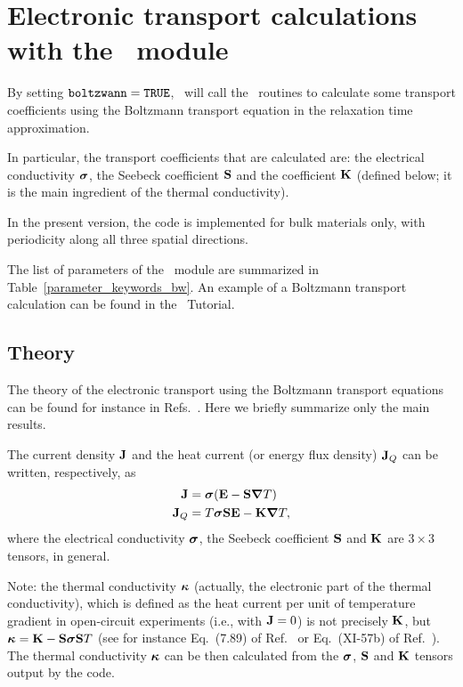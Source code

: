 \chapter{Electronic transport calculations with the \bw\ module}\label{ch:boltzwann}

By setting $\verb#boltzwann#=\verb#TRUE#$, \postw\ will call the \bw\ routines to calculate some transport coefficients using the Boltzmann transport equation in the relaxation time approximation.

In particular, the transport coefficients that are calculated are: the electrical conductivity $\bm{\mathrm{\sigma}}$, the Seebeck coefficient $\bm{\mathrm{S}}$ and the coefficient $\bm{\mathrm{K}}$ (defined below; it is the main ingredient of the thermal conductivity). 

In the present version, the code is implemented for bulk materials only, with periodicity along all three spatial directions.

The list of parameters of the \bw\ module are summarized in Table~\ref{parameter_keywords_bw}. 
An example of a Boltzmann transport calculation can be found in the \wannier\ Tutorial. 

\section{Theory}
\label{sec:boltzwann-theory}
The theory of the electronic transport using the Boltzmann transport equations can be found for instance in Refs.~\cite{Ziman,Grosso,Mahan}. Here we briefly summarize only the main results. 

The current density $\bm{\mathrm{J}}$ and the heat current (or energy flux density) $\bm{\mathrm{J}}_Q$ can be written, respectively, as
\begin{align}
  \bm{\mathrm{J}}   &= \bm{\mathrm{\sigma}}(\bm{\mathrm{E}} - \bm{\mathrm{S}} \bm{\mathrm{\nabla}} T) \\
  \bm{\mathrm{J}}_Q &= T \bm{\mathrm{\sigma}} \bm{\mathrm{S}} \bm{\mathrm{E}} - \bm{\mathrm{K}} \bm{\mathrm{\nabla}} T,
\end{align}
where the electrical conductivity $\bm{\mathrm{\sigma}}$, the Seebeck coefficient $\bm{\mathrm{S}}$ and $\bm{\mathrm{K}}$ are $3\times 3$ tensors, in general.

Note: the thermal conductivity $\bm{\mathrm{\kappa}}$ (actually, the electronic part of the thermal conductivity), which is defined as the heat current per unit of temperature gradient in open-circuit experiments (i.e., with $\bm{\mathrm{J}}=0$) is not precisely $\bm{\mathrm{K}}$, but  $\bm{\mathrm{\kappa}} = \bm{\mathrm{K}}-\bm{\mathrm{S}} \bm{\mathrm{\sigma}} \bm{\mathrm{S}} T$ (see for instance Eq.~(7.89) of Ref.~\cite{Ziman} or Eq.~(XI-57b) of Ref.~\cite{Grosso}).
The thermal conductivity $\bm{\mathrm{\kappa}}$ can be then calculated from the $\bm{\mathrm{\sigma}}$, $\bm{\mathrm{S}}$ and $\bm{\mathrm{K}}$ tensors output by the code.

